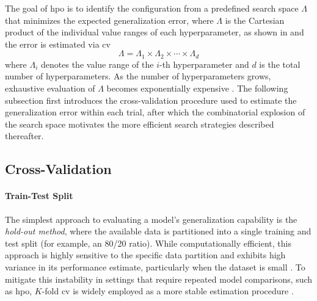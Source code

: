 The goal of \gls{hpo} is to identify the configuration from a predefined search space $\Lambda$ that minimizes the expected generalization error, where $\Lambda$ is the Cartesian product of the individual value ranges of each hyperparameter, as shown in  and the error is estimated via \gls{cv} \parencite{bergstraRandomSearchHyperParameter2012}
\begin{equation}
    \Lambda = \Lambda_1 \times \Lambda_2 \times \cdots \times \Lambda_d
    \label{eq:hpo_search_space}
\end{equation}
where $\Lambda_i$ denotes the value range of the $i$-th hyperparameter and $d$ is the total number of hyperparameters. As the number of hyperparameters grows, exhaustive evaluation of $\Lambda$ becomes exponentially expensive \parencite{bergstraRandomSearchHyperParameter2012, yangHyperparameterOptimizationMachine2020}. The following subsection first introduces the cross-validation procedure used to estimate the generalization error within each trial, after which the combinatorial explosion of the search space motivates the more efficient search strategies described thereafter.

\subsection{Cross-Validation}
\label{sec:theoretical_kfold}

\paragraph{Train-Test Split}
The simplest approach to evaluating a model's generalization capability is the \textit{hold-out method}, where the available data is partitioned into a single training and test split (for example, an 80/20 ratio). While computationally efficient, this approach is highly sensitive to the specific data partition and exhibits high variance in its performance estimate, particularly when the dataset is small \parencite{hastieElementsStatisticalLearning2017}. To mitigate this instability in settings that require repeated model comparisons, such as \gls{hpo}, $K$-fold \gls{cv} is widely employed as a more stable estimation procedure \parencite{hastieElementsStatisticalLearning2017}.

